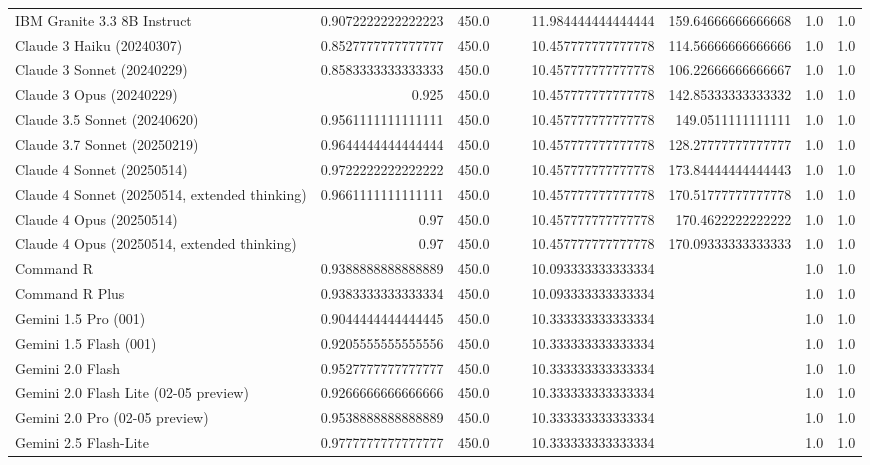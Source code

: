 \begin{table}[htp]
{\begin{tabular}{lrrrrrrrr}
IBM Granite 3.3 8B Instruct & 0.9072222222222223 & 450.0 &  &  & 11.984444444444444 & 159.64666666666668 & 1.0 & 1.0 \\
Claude 3 Haiku (20240307) & 0.8527777777777777 & 450.0 &  &  & 10.457777777777778 & 114.56666666666666 & 1.0 & 1.0 \\
Claude 3 Sonnet (20240229) & 0.8583333333333333 & 450.0 &  &  & 10.457777777777778 & 106.22666666666667 & 1.0 & 1.0 \\
Claude 3 Opus (20240229) & 0.925 & 450.0 &  &  & 10.457777777777778 & 142.85333333333332 & 1.0 & 1.0 \\
Claude 3.5 Sonnet (20240620) & 0.9561111111111111 & 450.0 &  &  & 10.457777777777778 & 149.0511111111111 & 1.0 & 1.0 \\
Claude 3.7 Sonnet (20250219) & 0.9644444444444444 & 450.0 &  &  & 10.457777777777778 & 128.27777777777777 & 1.0 & 1.0 \\
Claude 4 Sonnet (20250514) & 0.9722222222222222 & 450.0 &  &  & 10.457777777777778 & 173.84444444444443 & 1.0 & 1.0 \\
Claude 4 Sonnet (20250514, extended thinking) & 0.9661111111111111 & 450.0 &  &  & 10.457777777777778 & 170.51777777777778 & 1.0 & 1.0 \\
Claude 4 Opus (20250514) & 0.97 & 450.0 &  &  & 10.457777777777778 & 170.4622222222222 & 1.0 & 1.0 \\
Claude 4 Opus (20250514, extended thinking) & 0.97 & 450.0 &  &  & 10.457777777777778 & 170.09333333333333 & 1.0 & 1.0 \\
Command R & 0.9388888888888889 & 450.0 &  &  & 10.093333333333334 &  & 1.0 & 1.0 \\
Command R Plus & 0.9383333333333334 & 450.0 &  &  & 10.093333333333334 &  & 1.0 & 1.0 \\
Gemini 1.5 Pro (001) & 0.9044444444444445 & 450.0 &  &  & 10.333333333333334 &  & 1.0 & 1.0 \\
Gemini 1.5 Flash (001) & 0.9205555555555556 & 450.0 &  &  & 10.333333333333334 &  & 1.0 & 1.0 \\
Gemini 2.0 Flash & 0.9527777777777777 & 450.0 &  &  & 10.333333333333334 &  & 1.0 & 1.0 \\
Gemini 2.0 Flash Lite (02-05 preview) & 0.9266666666666666 & 450.0 &  &  & 10.333333333333334 &  & 1.0 & 1.0 \\
Gemini 2.0 Pro (02-05 preview) & 0.9538888888888889 & 450.0 &  &  & 10.333333333333334 &  & 1.0 & 1.0 \\
Gemini 2.5 Flash-Lite & 0.9777777777777777 & 450.0 &  &  & 10.333333333333334 &  & 1.0 & 1.0 \\

\end{tabular}}
\end{table}
